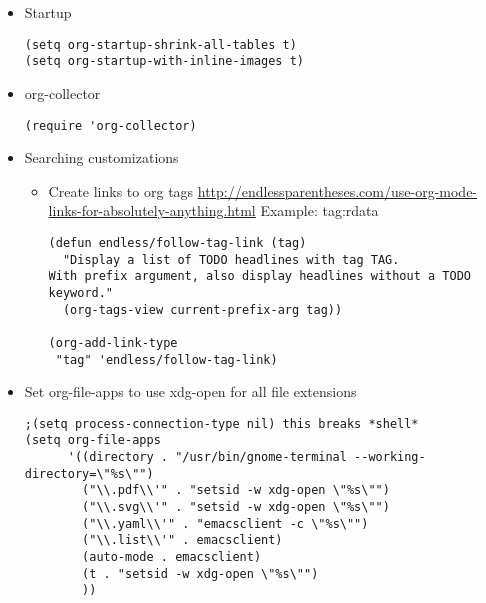\documentclass{article}
\begin{document}
\begin{itemize}
\begin{itemize}
\begin{itemize}
\item Startup
\label{sec:org6c0a094}
\begin{verbatim}
(setq org-startup-shrink-all-tables t)
(setq org-startup-with-inline-images t)
\end{verbatim}

\item org-collector
\label{sec:org69b37b7}
\begin{verbatim}
(require 'org-collector)
\end{verbatim}

\item Searching customizations
\label{sec:org878db73}

\begin{itemize}
\item Create links to org tags
\label{sec:org996d3e8}
\url{http://endlessparentheses.com/use-org-mode-links-for-absolutely-anything.html}
Example: tag:rdata
\begin{verbatim}
(defun endless/follow-tag-link (tag)
  "Display a list of TODO headlines with tag TAG.
With prefix argument, also display headlines without a TODO keyword."
  (org-tags-view current-prefix-arg tag))

(org-add-link-type
 "tag" 'endless/follow-tag-link)

\end{verbatim}
\end{itemize}
\item Set org-file-apps to use xdg-open for all file extensions
\label{sec:orga5692b0}

\begin{verbatim}
;(setq process-connection-type nil) this breaks *shell*
(setq org-file-apps
      '((directory . "/usr/bin/gnome-terminal --working-directory=\"%s\"")
        ("\\.pdf\\'" . "setsid -w xdg-open \"%s\"")
        ("\\.svg\\'" . "setsid -w xdg-open \"%s\"")
        ("\\.yaml\\'" . "emacsclient -c \"%s\"")	
        ("\\.list\\'" . emacsclient)
        (auto-mode . emacsclient)	
        (t . "setsid -w xdg-open \"%s\"")
        ))

\end{verbatim}


\end{itemize}
\end{itemize}
\end{itemize}
\end{document}
